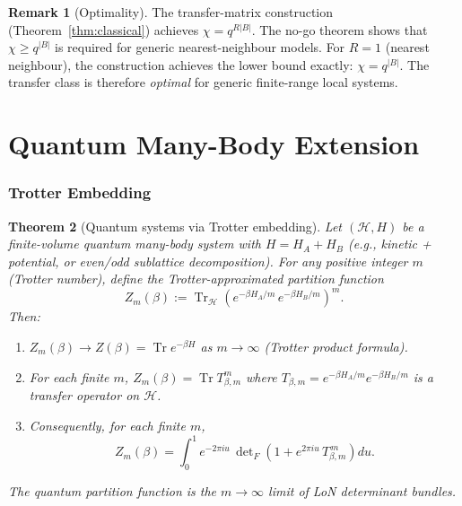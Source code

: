 \documentclass[12pt]{article}
\theoremstyle{plain}
\newtheorem{theorem}{Theorem}[section]
\theoremstyle{definition}
\newtheorem{remark}[theorem]{Remark}
\numberwithin{equation}{section}
\DeclareMathOperator{\Tr}{Tr}
\begin{document}
\begin{remark}[Optimality]
The transfer-matrix construction (Theorem~\ref{thm:classical}) achieves
$\chi=q^{R|B|}$.  The no-go theorem shows that $\chi\geq q^{|B|}$ is
required for generic nearest-neighbour models.  For $R=1$ (nearest
neighbour), the construction achieves the lower bound exactly:
$\chi=q^{|B|}$.  The transfer class is therefore \emph{optimal} for
generic finite-range local systems.
\end{remark}


\part{Quantum Many-Body Extension}

\section{Trotter Embedding}\label{sec:trotter}

\begin{theorem}[Quantum systems via Trotter embedding]\label{thm:trotter}
Let $(\mathcal{H},H)$ be a finite-volume quantum many-body system
with $H=H_A+H_B$ (e.g., kinetic + potential, or even/odd sublattice
decomposition).  For any positive integer $m$ (Trotter number), define
the Trotter-approximated partition function
\begin{equation}
Z_m(\beta) := \Tr_{\mathcal{H}}\!\left(
e^{-\beta H_A/m}\,e^{-\beta H_B/m}\right)^m.
\end{equation}
Then:
\begin{enumerate}[label=(\roman*)]
\item $Z_m(\beta)\to Z(\beta)=\Tr e^{-\beta H}$ as $m\to\infty$
      (Trotter product formula).
\item For each finite $m$, $Z_m(\beta)=\Tr T_{\beta,m}^m$ where
      $T_{\beta,m}=e^{-\beta H_A/m}e^{-\beta H_B/m}$ is a transfer
      operator on $\mathcal{H}$.
\item Consequently, for each finite $m$,
\begin{equation}
\boxed{Z_m(\beta) = \int_0^1 e^{-2\pi iu}\,
\det\nolimits_F\!\left(1+e^{2\pi iu}\,T_{\beta,m}^{\,m}\right)du.}
\end{equation}
\end{enumerate}
The quantum partition function is the $m\to\infty$ limit of
LoN determinant bundles.
\end{theorem}
\end{document}
